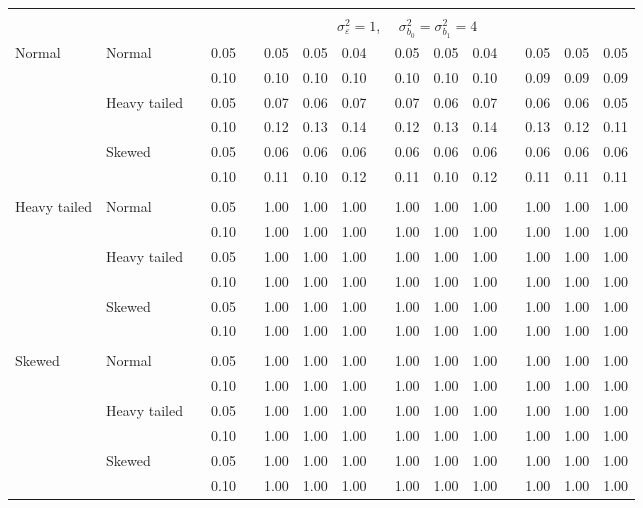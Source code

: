 \begin{table}[ht]
\begin{scriptsize}
\begin{center}
\begin{tabular}{ll p{.1cm} c p{.1cm} rrr p{.1cm} rrr p{.1cm} rrr}
&&&&&&&&&&&&&&&\\
& && && \multicolumn{9}{c}{$\sigma_{\varepsilon}^2 = 1$, \ \ $\sigma_{b_0}^2 = \sigma_{b_1}^2 = 4$} \\ \cline{6-16}

\rowcolor{gray!20}Normal       & Normal       && 0.05 &&   0.05 & 0.05 & 0.04 && 0.05 & 0.05 & 0.04 && 0.05 & 0.05 & 0.05 \\ 
\rowcolor{gray!20}             &              && 0.10 &&   0.10 & 0.10 & 0.10 && 0.10 & 0.10 & 0.10 && 0.09 & 0.09 & 0.09 \\ 
\rowcolor{gray!20}             & Heavy tailed && 0.05 &&   0.07 & 0.06 & 0.07 && 0.07 & 0.06 & 0.07 && 0.06 & 0.06 & 0.05 \\ 
\rowcolor{gray!20}             &              && 0.10 &&   0.12 & 0.13 & 0.14 && 0.12 & 0.13 & 0.14 && 0.13 & 0.12 & 0.11 \\ 
\rowcolor{gray!20}             & Skewed       && 0.05 &&   0.06 & 0.06 & 0.06 && 0.06 & 0.06 & 0.06 && 0.06 & 0.06 & 0.06 \\ 
\rowcolor{gray!20}             &              && 0.10 &&   0.11 & 0.10 & 0.12 && 0.11 & 0.10 & 0.12 && 0.11 & 0.11 & 0.11 \\ 
             &&&&&&&&&&&&&&&\\
Heavy tailed & Normal       && 0.05 &&   1.00 & 1.00 & 1.00 && 1.00 & 1.00 & 1.00 && 1.00 & 1.00 & 1.00 \\ 
             &              && 0.10 &&   1.00 & 1.00 & 1.00 && 1.00 & 1.00 & 1.00 && 1.00 & 1.00 & 1.00 \\ 
             & Heavy tailed && 0.05 &&   1.00 & 1.00 & 1.00 && 1.00 & 1.00 & 1.00 && 1.00 & 1.00 & 1.00 \\ 
             &              && 0.10 &&   1.00 & 1.00 & 1.00 && 1.00 & 1.00 & 1.00 && 1.00 & 1.00 & 1.00 \\ 
             & Skewed       && 0.05 &&   1.00 & 1.00 & 1.00 && 1.00 & 1.00 & 1.00 && 1.00 & 1.00 & 1.00 \\ 
             &              && 0.10 &&   1.00 & 1.00 & 1.00 && 1.00 & 1.00 & 1.00 && 1.00 & 1.00 & 1.00 \\ 
             &&&&&&&&&&&&&&&\\
Skewed       & Normal       && 0.05 &&   1.00 & 1.00 & 1.00 && 1.00 & 1.00 & 1.00 && 1.00 & 1.00 & 1.00 \\ 
             &              && 0.10 &&   1.00 & 1.00 & 1.00 && 1.00 & 1.00 & 1.00 && 1.00 & 1.00 & 1.00 \\ 
             & Heavy tailed && 0.05 &&   1.00 & 1.00 & 1.00 && 1.00 & 1.00 & 1.00 && 1.00 & 1.00 & 1.00 \\ 
             &              && 0.10 &&   1.00 & 1.00 & 1.00 && 1.00 & 1.00 & 1.00 && 1.00 & 1.00 & 1.00 \\ 
             & Skewed       && 0.05 &&   1.00 & 1.00 & 1.00 && 1.00 & 1.00 & 1.00 && 1.00 & 1.00 & 1.00 \\ 
             &              && 0.10 &&   1.00 & 1.00 & 1.00 && 1.00 & 1.00 & 1.00 && 1.00 & 1.00 & 1.00 \\ 


\end{tabular}
\end{center}
\end{scriptsize}
\end{table}

